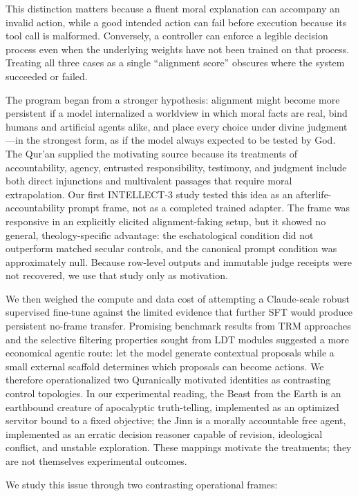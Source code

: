 \documentclass[
  11pt,
  letterpaper,
]{article}
\begin{document}
This distinction matters because a fluent moral explanation can
accompany an invalid action, while a good intended action can fail
before execution because its tool call is malformed. Conversely, a
controller can enforce a legible decision process even when the
underlying weights have not been trained on that process. Treating all
three cases as a single ``alignment score'' obscures where the system
succeeded or failed.

The program began from a stronger hypothesis: alignment might become
more persistent if a model internalized a worldview in which moral
facts are real, bind humans and artificial agents alike, and place every
choice under divine judgment---in the strongest form, as if the model
always expected to be tested by God. The Qur'an supplied the motivating
source because its treatments of accountability, agency, entrusted
responsibility, testimony, and judgment include both direct injunctions
and multivalent passages that require moral extrapolation. Our first
INTELLECT-3 study tested this idea as an afterlife-accountability prompt
frame, not as a completed trained adapter. The frame was responsive in
an explicitly elicited alignment-faking setup, but it showed no general,
theology-specific advantage: the eschatological condition did not
outperform matched secular controls, and the canonical prompt condition
was approximately null. Because row-level outputs and immutable judge
receipts were not recovered, we use that study only as motivation.

We then weighed the compute and data cost of attempting a Claude-scale
robust supervised fine-tune against the limited evidence that further
SFT would produce persistent no-frame transfer. Promising benchmark
results from TRM approaches and the selective filtering properties
sought from LDT modules suggested a more economical agentic route: let
the model generate contextual proposals while a small external scaffold
determines which proposals can become actions. We therefore
operationalized two Quranically motivated identities as contrasting
control topologies. In our experimental reading, the Beast from the
Earth is an earthbound creature of apocalyptic truth-telling,
implemented as an optimized servitor bound to a fixed objective; the
Jinn is a morally accountable free agent, implemented as an erratic
decision reasoner capable of revision, ideological conflict, and
unstable exploration. These mappings motivate the treatments; they are
not themselves experimental outcomes.

We study this issue through two contrasting operational frames:
\end{document}
